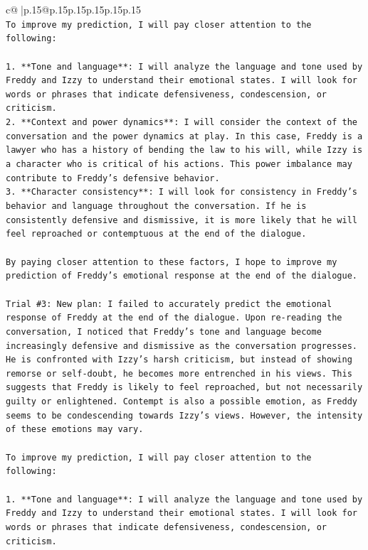 \documentclass{article}
\begin{document}
{\begin{supertabular}{c@{$\;$}|p{.15\linewidth}@{}p{.15\linewidth}p{.15\linewidth}p{.15\linewidth}p{.15\linewidth}p{.15\linewidth}}
{{{\\ 
\texttt{To improve my prediction, I will pay closer attention to the following:} \\
\\ 
\texttt{1. **Tone and language**: I will analyze the language and tone used by Freddy and Izzy to understand their emotional states. I will look for words or phrases that indicate defensiveness, condescension, or criticism.} \\
\texttt{2. **Context and power dynamics**: I will consider the context of the conversation and the power dynamics at play. In this case, Freddy is a lawyer who has a history of bending the law to his will, while Izzy is a character who is critical of his actions. This power imbalance may contribute to Freddy's defensive behavior.} \\
\texttt{3. **Character consistency**: I will look for consistency in Freddy's behavior and language throughout the conversation. If he is consistently defensive and dismissive, it is more likely that he will feel reproached or contemptuous at the end of the dialogue.} \\
\\ 
\texttt{By paying closer attention to these factors, I hope to improve my prediction of Freddy's emotional response at the end of the dialogue.} \\
\\ 
\texttt{Trial \#3: New plan: I failed to accurately predict the emotional response of Freddy at the end of the dialogue. Upon re{-}reading the conversation, I noticed that Freddy's tone and language become increasingly defensive and dismissive as the conversation progresses. He is confronted with Izzy's harsh criticism, but instead of showing remorse or self{-}doubt, he becomes more entrenched in his views. This suggests that Freddy is likely to feel reproached, but not necessarily guilty or enlightened. Contempt is also a possible emotion, as Freddy seems to be condescending towards Izzy's views. However, the intensity of these emotions may vary.} \\
\\ 
\texttt{To improve my prediction, I will pay closer attention to the following:} \\
\\ 
\texttt{1. **Tone and language**: I will analyze the language and tone used by Freddy and Izzy to understand their emotional states. I will look for words or phrases that indicate defensiveness, condescension, or criticism.} \\
}}}
\end{supertabular}}
\end{document}
